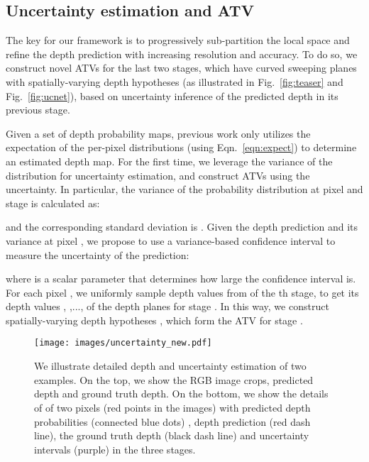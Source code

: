 \subsection{Uncertainty estimation and ATV}
\label{sec:uncertainty}
The key for our framework is to progressively sub-partition the local space and refine the depth prediction with increasing resolution and accuracy.
To do so, we construct novel ATVs for the last two stages, which have curved sweeping planes with spatially-varying depth hypotheses 
(as illustrated in Fig.~\ref{fig:teaser} and Fig.~\ref{fig:ucnet}),
based on uncertainty inference of the predicted depth in its previous stage.


Given a set of depth probability maps, 
previous work only utilizes the expectation of the per-pixel distributions 
(using Eqn.~\eqref{eqn:expect}) to determine an estimated depth map.
For the first time, we leverage the variance of the distribution for uncertainty estimation, 
and construct ATVs using the uncertainty.
In particular, the variance  of the probability distribution at pixel  and stage  is calculated as:

and the corresponding standard deviation is .
Given the depth prediction  and its variance  at pixel , 
we propose to use a variance-based confidence interval to measure the uncertainty of the prediction:

where  is a scalar parameter that determines how large the confidence interval is.
For each pixel , we uniformly sample  depth values from  of the th stage, 
to get its depth values , ,..., of the depth planes for stage .
In this way, we construct  spatially-varying depth hypotheses , which 
form the ATV for stage .

\begin{figure}[t]
    \centering
    \texttt{[image: images/uncertainty\_new.pdf]}
	\caption{ 
	We illustrate detailed depth and uncertainty estimation of two examples.
	On the top, we show the RGB image crops, predicted depth and ground truth depth.
	On the bottom, 
	we show the details of of two pixels (red points in the images) with predicted depth probabilities (connected blue dots) , 
	depth prediction (red dash line), the ground truth depth (black dash line) 
	and uncertainty intervals (purple) in the three stages.}
    \label{fig:method}
\end{figure}

